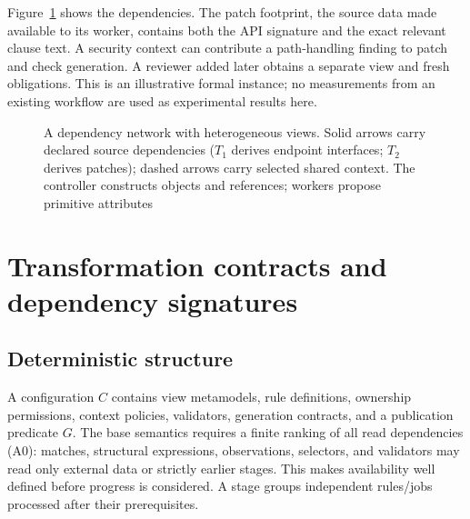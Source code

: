 \documentclass[pdflatex,sn-mathphys-num]{sn-jnl}
\theoremstyle{thmstyleone}
\theoremstyle{thmstylethree}
\theoremstyle{thmstyletwo}
\begin{document}
Figure~\ref{fig:network} shows the dependencies. The patch footprint, the source data made available to its worker, contains both the API signature and the exact relevant clause text. A security context can contribute a path-handling finding to patch and check generation. A reviewer added later obtains a separate view and fresh obligations. This is an illustrative formal instance; no measurements from an existing workflow are used as experimental results here.

\begin{figure}[tb]
\centering
{}
\caption{A dependency network with heterogeneous views. Solid arrows carry declared source dependencies ($T_1$ derives endpoint interfaces; $T_2$ derives patches); dashed arrows carry selected shared context. The controller constructs objects and references; workers propose primitive attributes}\label{fig:network}
\end{figure}

\section{Transformation contracts and dependency signatures}\label{sec:contracts}
\subsection{Deterministic structure}
A configuration $C$ contains view metamodels, rule definitions, ownership permissions, context policies, validators, generation contracts, and a publication predicate $G$. The base semantics requires a finite ranking of all read dependencies (A0): matches, structural expressions, observations, selectors, and validators may read only external data or strictly earlier stages. This makes availability well defined before progress is considered. A stage groups independent rules/jobs processed after their prerequisites.
\end{document}
